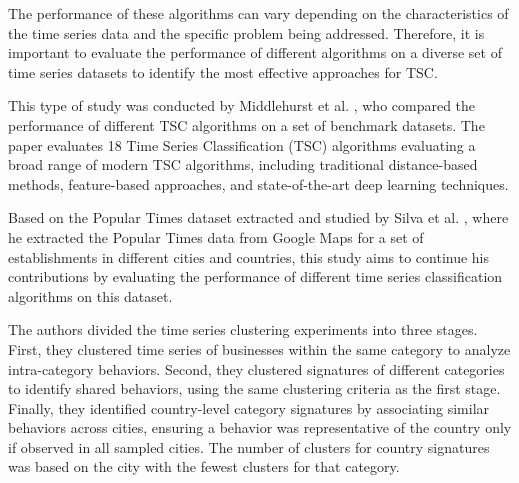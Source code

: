 \documentclass{ieeeaccess}
\begin{document}
The performance of these algorithms can vary depending on the characteristics of the time series data and the specific problem being addressed. Therefore, it is important to evaluate the performance of different algorithms on a diverse set of time series datasets to identify the most effective approaches for TSC.

This type of study was conducted by Middlehurst et al. \cite{middlehurst2024bakeoff}, who compared the performance of different TSC algorithms on a set of benchmark datasets. The paper evaluates 18 Time Series Classification (TSC) algorithms evaluating a broad range of modern TSC algorithms, including traditional distance-based methods, feature-based approaches, and state-of-the-art deep learning techniques. 

Based on the Popular Times dataset extracted and studied by Silva et al. \cite{silva2019signatures}, where he extracted the Popular Times data from Google Maps for a set of establishments in different cities and countries, this study aims to continue his contributions by evaluating the performance of different time series classification algorithms on this dataset.

The authors divided the time series clustering experiments into three stages. First, they clustered time series of businesses within the same category to analyze intra-category behaviors. Second, they clustered signatures of different categories to identify shared behaviors, using the same clustering criteria as the first stage. Finally, they identified country-level category signatures by associating similar behaviors across cities, ensuring a behavior was representative of the country only if observed in all sampled cities. The number of clusters for country signatures was based on the city with the fewest clusters for that category.
\end{document}
